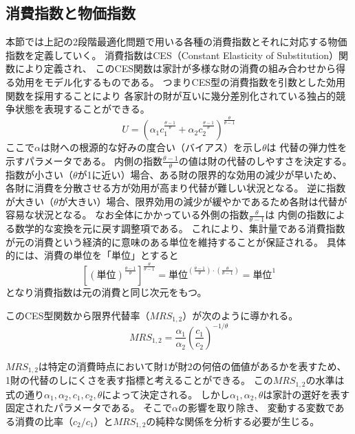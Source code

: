 
\subsection{消費指数と物価指数}
\label{sec:chapter3_households_indices}
本節では上記の2段階最適化問題で用いる各種の消費指数とそれに対応する物価指数を定義していく。
消費指数はCES（Constant Elasticity of Substitution）関数により定義され、
このCES関数は家計が多様な財の消費の組み合わせから得る効用をモデル化するものである。
つまりCES型の消費指数を引数とした効用関数を採用することにより
各家計の財が互いに幾分差別化されている独占的競争状態を表現することができる。
\begin{equation}
\label{form:chapter3_households_indices_ces_eq}
    U=\left(\alpha_1c_1^{\frac{\theta-1}{\theta}}+\alpha_2c_2^{\frac{\theta-1}{\theta}}\right)^{\frac{\theta}{\theta-1}}
\end{equation}
ここで\(\alpha\)は財への根源的な好みの度合い（バイアス）を示し\(\theta\)は
代替の弾力性を示すパラメータである。
内側の指数\(\frac{\theta-1}{\theta}\)の値は財の代替のしやすさを決定する。
指数が小さい（\(\theta\)が1に近い）場合、ある財の限界的な効用の減少が早いため、
各財に消費を分散させる方が効用が高まり代替が難しい状況となる。
逆に指数が大きい（\(\theta\)が大きい）場合、限界効用の減少が緩やかであるため各財は代替が容易な状況となる。
なお全体にかかっている外側の指数\(\frac{\theta}{\theta-1}\)は
内側の指数による数学的な変換を元に戻す調整項である。
これにより、集計量である消費指数が元の消費という経済的に意味のある単位を維持することが保証される。
具体的には、消費の単位を「単位」とすると
\begin{equation}
\label{form:chapter3_households_indices_ces_units}
    \left[(\text{単位})^{\frac{\theta-1}{\theta}}\right]^{\frac{\theta}{\theta-1}}=\text{単位}^{(\frac{\theta-1}{\theta})\cdot(\frac{\theta}{\theta-1})}=\text{単位}^1
\end{equation}
となり消費指数は元の消費と同じ次元をもつ。

このCES型関数から限界代替率（\(MRS_{1,2}\)）が次のように導かれる。
\begin{equation}
\label{form:chapter3_households_indices_mrs}
    MRS_{1,2}=\frac{\alpha_1}{\alpha_2}\left(\frac{c_1}{c_2}\right)^{-1/\theta}
\end{equation}

\(MRS_{1,2}\)は特定の消費時点において財1が財2の何倍の価値があるかを表すため、
1財の代替のしにくさを表す指標と考えることができる。
この\(MRS_{1,2}\)の水準は式の通り\(\alpha_1,\alpha_2,c_1,c_2,\theta\)によって決定される。
しかし\(\alpha_1,\alpha_2,\theta\)は家計の選好を表す固定されたパラメータである。
そこで\(\alpha\)の影響を取り除き、
変動する変数である消費の比率（\(c_2/c_1\)）と\(MRS_{1,2}\)の純粋な関係を分析する必要が生じる。

